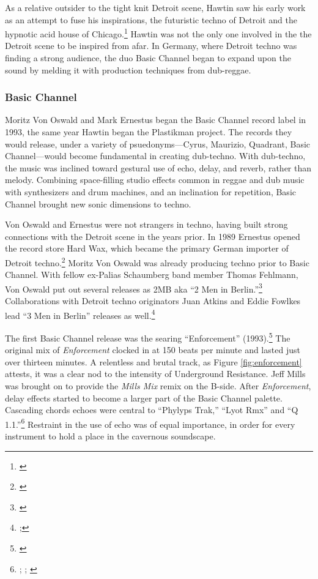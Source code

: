 \documentclass[12pt,twoside]{reedthesis}
\begin{document}
As a relative outsider to the tight knit Detroit scene, Hawtin saw his early work as an attempt to fuse his inspirations, the futuristic techno of Detroit and the hypnotic acid house of Chicago.\footnote{\cite{burnsRichieHawtinLecture2013}} Hawtin was not the only one involved in the the Detroit scene to be inspired from afar. In Germany, where Detroit techno was finding a strong audience, the duo Basic Channel began to expand upon the sound by melding it with production techniques from dub-reggae.

\subsubsection{Basic Channel}
Moritz Von Oswald and Mark Ernestus began the Basic Channel record label in 1993, the same year Hawtin began the Plastikman project. The records they would release, under a variety of psuedonyms---Cyrus, Maurizio, Quadrant, Basic Channel---would become fundamental in creating dub-techno. With dub-techno, the music was inclined toward gestural use of echo, delay, and reverb, rather than melody. Combining space-filling studio effects common in reggae and dub music with synthesizers and drum machines, and an inclination for repetition, Basic Channel brought new sonic dimensions to techno.

Von Oswald and Ernestus were not strangers in techno, having built strong connections with the Detroit scene in the years prior. In 1989 Ernestus opened the record store Hard Wax, which became the primary German importer of Detroit techno.\footnote{\cite{mcdermottLabelMonthBasic2018}} Moritz Von Oswald was already producing techno prior to Basic Channel. With fellow ex-Palias Schaumberg band member Thomas Fehlmann, Von Oswald put out several releases as 2MB aka ``2 Men in Berlin.''\footnote{\cite{2MB}} Collaborations with Detroit techno originators Juan Atkins and Eddie Fowlkes lead ``3 Men in Berlin'' releases as well.\footnote{\cite{3MB};\cite{fehlmannTimetable}}

The first Basic Channel release was the searing ``Enforcement'' (1993).\footnote{\cite{cyrusEnforcement1993}} The original mix of \emph{Enforcement} clocked in at 150 beats per minute and lasted just over thirteen minutes. A relentless and brutal track, as Figure \ref{fig:enforcement} attests, it was a clear nod to the intensity of Underground Resistance. Jeff Mills was brought on to provide the \emph{Mills Mix} remix on the B-side. After \emph{Enforcement}, delay effects started to become a larger part of the Basic Channel palette. Cascading chords echoes were central to ``Phylyps Trak,'' ``Lyot Rmx'' and ``Q 1.1.''\footnote{\cite{basicchannelPhylypsTrak1993}; \cite{basicchannelLyotRmx1993}; \cite{basicchannelQ111993}} Restraint in the use of echo was of equal importance, in order for every instrument to hold a place in the cavernous soundscape.
\end{document}

